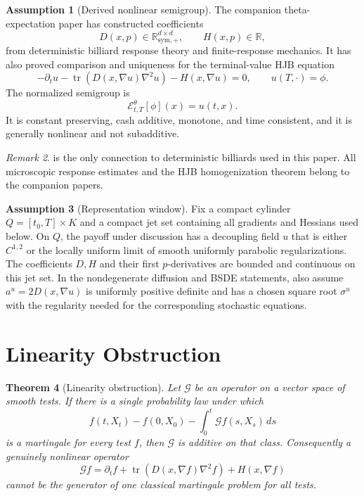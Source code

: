 \documentclass[11pt]{amsart}
\newtheorem{theorem}{Theorem}[section]
\theoremstyle{definition}
\newtheorem{assumption}[theorem]{Assumption}
\theoremstyle{remark}
\newtheorem{remark}[theorem]{Remark}
\newcommand{\R}{\mathbb R}
\newcommand{\Etheta}{\mathcal E^\theta}
\newcommand{\Gcal}{\mathcal G}
\newcommand{\Tr}{\operatorname{tr}}
\begin{document}
\begin{assumption}[Derived nonlinear semigroup]
\label{ass:theta_semigroup_input}
The companion theta-expectation paper has constructed coefficients
\[
  D(x,p)\in\R^{d\times d}_{\mathrm{sym},+},
  \qquad H(x,p)\in\R,
\]
from deterministic billiard response theory and finite-response mechanics.  It
has also proved comparison and uniqueness for the terminal-value HJB equation
\begin{equation}
\label{eq:input_hjb}
  -\partial_t u-\Tr(D(x,\nabla u)\nabla^2u)-H(x,\nabla u)=0,
  \qquad u(T,\cdot)=\phi .
\end{equation}
The normalized semigroup is
\begin{equation}
  \Etheta_{t,T}[\phi](x)=u(t,x).
\end{equation}
It is constant preserving, cash additive, monotone, and time consistent, and it
is generally nonlinear and not subadditive.
\end{assumption}

\begin{remark}
 is the only connection to deterministic
billiards used in this paper.  All microscopic response estimates and the HJB
homogenization theorem belong to the companion papers.
\end{remark}

\begin{assumption}[Representation window]
\label{ass:representation_window}
Fix a compact cylinder \(Q=[t_0,T]\times K\) and a compact jet set containing
all gradients and Hessians used below.  On \(Q\), the payoff under discussion
has a decoupling field \(u\) that is either \(C^{1,2}\) or the locally uniform
limit of smooth uniformly parabolic regularizations.  The coefficients
\(D,H\) and their first \(p\)-derivatives are bounded and continuous on this
jet set.  In the nondegenerate diffusion and BSDE statements, also assume
\(a^u=2D(x,\nabla u)\) is uniformly positive definite and has a chosen square
root \(\sigma^u\) with the regularity needed for the corresponding stochastic
equations.
\end{assumption}

\section{Linearity Obstruction}

\begin{theorem}[Linearity obstruction]
\label{thm:linearity_obstruction}
Let $\Gcal$ be an operator on a vector space of smooth tests.  If there is a
single probability law under which
\begin{equation}
  f(t,X_t)-f(0,X_0)-\int_0^t \Gcal f(s,X_s)\,ds
\end{equation}
is a martingale for every test $f$, then $\Gcal$ is additive on that class.
Consequently a genuinely nonlinear operator
\begin{equation}
  \Gcal f=\partial_t f+\Tr(D(x,\nabla f)\nabla^2f)+H(x,\nabla f)
\end{equation}
cannot be the generator of one classical martingale problem for all tests.
\end{theorem}
\end{document}
